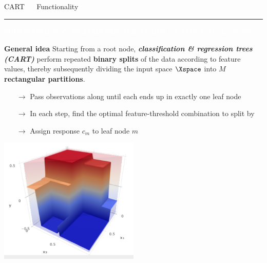 \documentclass[11pt,compress,t,notes=noshow, xcolor=table]{beamer}
\begin{document}
\LARGE
\begin{frame}{\textcolor{gray!80}{CART} ~~ Functionality}
\normalsize
\vspace{-0.5cm}
\noindent \textcolor{gray!80}{\rule{\textwidth}{1pt}}

\vspace{0.2cm}

\scriptsize

\colorbox{gray!80}{\textcolor{white}{SUPERVISED}} 
\colorbox{gray!80}{\textcolor{white}{NON-PARAMETRIC}} 
\colorbox{gray!80}{\textcolor{white}{WHITE-BOX}} 
\colorbox{gray!80}{\textcolor{white}{FEATURE SELECTION}}

\medskip

\small

\textbf{\textcolor{gray!80}{General idea}} {}{} Starting from a root node, 
\textit{\textbf{classification \& regression trees (CART)}} 
perform repeated \textbf{binary splits} of the data according to feature values, 
thereby subsequently dividing the input space $\Xspace$ into $M$ 
\textbf{rectangular partitions}.

\begin{itemize}
  \item [$\rightarrow$] Pass observations along until each ends up in exactly 
  one leaf node
  \item [$\rightarrow$] In each step, find the optimal feature-threshold
  combination to split by
  \item [$\rightarrow$] Assign response $c_m$ to leaf node $m$
\end{itemize}

\includegraphics[width=0.5\textwidth]{figure/cart_3d.PNG}

\end{frame}
\end{document}
